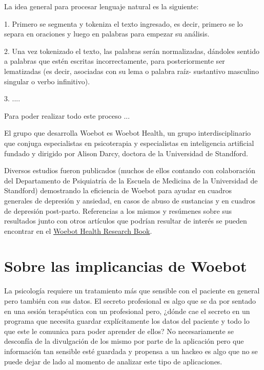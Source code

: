 \documentclass[11pt]{article}
\begin{document}
La idea general para procesar lenguaje natural es la siguiente: 

1. Primero se segmenta y tokeniza el texto ingresado, es decir, primero se lo separa en oraciones y luego en palabras para empezar su análisis. 

2. Una vez tokenizado el texto, las palabras serán normalizadas, dándoles sentido a palabras que estén escritas incorrectamente, para 
posteriormente ser lematizadas (es decir, asociadas con su lema o palabra raíz- sustantivo masculino singular o verbo infinitivo). 

3. 
....

Para poder realizar todo este proceso ...



El grupo que desarrolla Woebot es Woebot Health, un grupo interdisciplinario que conjuga especialistas en psicoterapia y especialistas en inteligencia artificial fundado y dirigido por Alison Darcy, doctora de la Universidad de Standford.

Diversos estudios fueron publicados (muchos de ellos contando con colaboración del Departamento de Psiquiatría de la Escuela de Medicina de la Universidad de Standford) demostrando la eficiencia de Woebot para ayudar en cuadros generales de depresión y ansiedad, en casos de abuso de sustancias y en cuadros de depresión post-parto.
Referencias a los mismos y resúmenes sobre sus resultados 
junto con otros artículos que podrían resultar de interés
se pueden encontrar en el \href{https://woebothealth.com/img/2021/05/Woebot-Health-Research-Bibliography_May-2021-1-1.pdf}{Woebot Health Research Book}.

\section{Sobre las implicancias de Woebot}

La psicología requiere un tratamiento más que sensible
con el paciente en general pero también con sus datos.
El secreto profesional es algo que se da por sentado en
una sesión terapéutica con un profesional pero, ¿dónde cae
el secreto en un programa que necesita guardar explícitamente
los datos del paciente y todo lo que este le comunica
para poder aprender de ellos? No necesariamente se desconfía
de la divulgación de los mismo por parte de la aplicación
pero que información tan sensible esté guardada y propensa a
un hackeo es algo que no se puede dejar de lado al momento
de analizar este tipo de aplicaciones.
\end{document}
